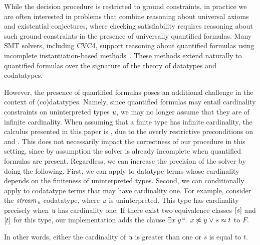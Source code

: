 While the decision procedure is restricted to ground constraints,
in practice we are often interested in problems that combine reasoning about universal axioms and existential conjectures,
where checking satisfiability requires reasoning about such ground constraints in the presence of universally quantified formulas.
Many SMT solvers, including CVC4, support reasoning about quantified formulas using incomplete instantiation-based methods~\cite{MouraBjoerner07,ReynoldsTinelliMoura14}.
These methods extend naturally to quantified formulas over the signature of the theory of datatypes and codatatypes.

However, the presence of quantified formulas poses an additional challenge in the context of (co)datatypes.
Namely, since quantified formulas may entail cardinality constraints on uninterpreted types $\textit{u}$,
we may no longer assume that they are of infinite cardinality.
When assuming that a finite type has infinite cardinality, the calculus presented in this paper is ,
due to the overly restrictive preconditions on  and .
This does not necessarily impact the correctness of our procedure in this setting,
since by assumption the solver is already incomplete when quantified formulas are present.
Regardless, we can increase the precision of the solver by doing the following.
First, we can apply  to datatype terms whose cardinality depends on the finiteness of uninterpreted types.
Second, we can conditionally apply  to codatatype terms that may have cardinality one.
For example, consider the $\textit{stream}_{\,\textit{u}}$ codatatype, where $\textit{u}$ is uninterpreted.
This type has cardinality precisely when $\textit{u}$ has cardinality one.
If there exist two equivalence classes $[s]$ and $[t]$ for this type,
our implementation adds the clause %
$\exists x\;y\typ{\ty{u}}.\;\, x \not\teq y \mathrel\vee s \teq t$ to $F$.
\begin{rep}In other words, either the cardinality of $\textit{u}$ is greater than one or $s$ is equal to $t$.\end{rep}

